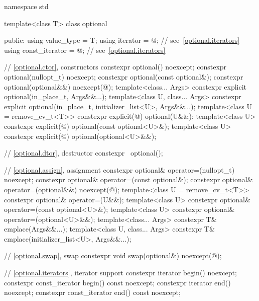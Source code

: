 %
%
\begin{codeblock}
namespace std {
  template<class T>
  class optional {
  public:
    using value_type     = T;
    using iterator       = @\impdefnc@;              // see~\ref{optional.iterators}
    using const_iterator = @\impdefnc@;              // see~\ref{optional.iterators}

    // \ref{optional.ctor}, constructors
    constexpr optional() noexcept;
    constexpr optional(nullopt_t) noexcept;
    constexpr optional(const optional&);
    constexpr optional(optional&&) noexcept(@\seebelow@);
    template<class... Args>
      constexpr explicit optional(in_place_t, Args&&...);
    template<class U, class... Args>
      constexpr explicit optional(in_place_t, initializer_list<U>, Args&&...);
    template<class U = remove_cv_t<T>>
      constexpr explicit(@\seebelow@) optional(U&&);
    template<class U>
      constexpr explicit(@\seebelow@) optional(const optional<U>&);
    template<class U>
      constexpr explicit(@\seebelow@) optional(optional<U>&&);

    // \ref{optional.dtor}, destructor
    constexpr ~optional();

    // \ref{optional.assign}, assignment
    constexpr optional& operator=(nullopt_t) noexcept;
    constexpr optional& operator=(const optional&);
    constexpr optional& operator=(optional&&) noexcept(@\seebelow@);
    template<class U = remove_cv_t<T>> constexpr optional& operator=(U&&);
    template<class U> constexpr optional& operator=(const optional<U>&);
    template<class U> constexpr optional& operator=(optional<U>&&);
    template<class... Args> constexpr T& emplace(Args&&...);
    template<class U, class... Args> constexpr T& emplace(initializer_list<U>, Args&&...);

    // \ref{optional.swap}, swap
    constexpr void swap(optional&) noexcept(@\seebelow@);

    // \ref{optional.iterators}, iterator support
    constexpr iterator begin() noexcept;
    constexpr const_iterator begin() const noexcept;
    constexpr iterator end() noexcept;
    constexpr const_iterator end() const noexcept;

}}
\end{codeblock}

